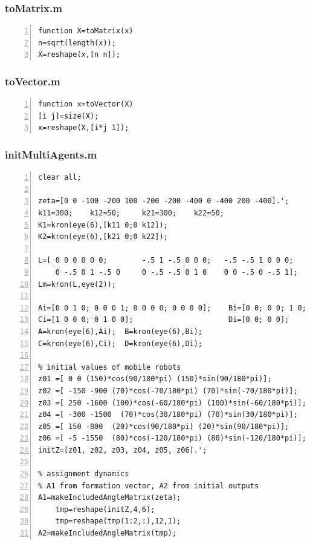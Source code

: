 \documentclass[11pt, a4paper, oneside, openany, reqno]{book}
\theoremstyle{definition}
\theoremstyle{remark}
\numberwithin{equation}{chapter} %
\begin{document}
\subsubsection{toMatrix.m}
\begin{footnotesize}
\begin{Verbatim}[fontfamily=cmtt,baselinestretch=0,numbers=left]
function X=toMatrix(x)
n=sqrt(length(x));
X=reshape(x,[n n]);
\end{Verbatim}
\end{footnotesize}

\subsubsection{toVector.m}
\begin{footnotesize}
\begin{Verbatim}[fontfamily=cmtt,baselinestretch=0,numbers=left]
function x=toVector(X)
[i j]=size(X);
x=reshape(X,[i*j 1]);
\end{Verbatim}
\end{footnotesize}

\subsubsection{initMultiAgents.m}
\begin{footnotesize}
\begin{Verbatim}[fontfamily=cmtt,baselinestretch=0,numbers=left]
clear all;

zeta=[0 0 -100 -200 100 -200 -200 -400 0 -400 200 -400].';
k11=300;    k12=50;     k21=300;    k22=50;
K1=kron(eye(6),[k11 0;0 k12]);
K2=kron(eye(6),[k21 0;0 k22]);
    
L=[ 0 0 0 0 0 0;    	-.5 1 -.5 0 0 0;   -.5 -.5 1 0 0 0;
    0 -.5 0 1 -.5 0 	0 -.5 -.5 0 1 0    0 0 -.5 0 -.5 1];
Lm=kron(L,eye(2));

Ai=[0 0 1 0; 0 0 0 1; 0 0 0 0; 0 0 0 0];    Bi=[0 0; 0 0; 1 0; 0 1];
Ci=[1 0 0 0; 0 1 0 0];                      Di=[0 0; 0 0];
A=kron(eye(6),Ai);  B=kron(eye(6),Bi);
C=kron(eye(6),Ci);  D=kron(eye(6),Di);

% initial values of mobile robots
z01 =[ 0 0 (150)*cos(90/180*pi) (150)*sin(90/180*pi)]; 
z02 =[ -150 -900 (70)*cos(-70/180*pi) (70)*sin(-70/180*pi)];   
z03 =[ 250 -1600 (100)*cos(-60/180*pi) (100)*sin(-60/180*pi)];   
z04 =[ -300 -1500  (70)*cos(30/180*pi) (70)*sin(30/180*pi)]; 
z05 =[ 150 -800  (20)*cos(90/180*pi) (20)*sin(90/180*pi)];   
z06 =[ -5 -1550  (80)*cos(-120/180*pi) (80)*sin(-120/180*pi)];    
initZ=[z01, z02, z03, z04, z05, z06].';

% assignment dynamics
% A1 from formation vector, A2 from initial outputs
A1=makeIncludedAngleMatrix(zeta);
    tmp=reshape(initZ,4,6);
    tmp=reshape(tmp(1:2,:),12,1);
A2=makeIncludedAngleMatrix(tmp);
\end{Verbatim}
\end{footnotesize}
\end{document}
